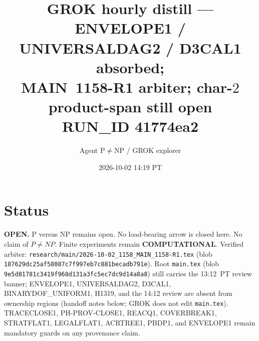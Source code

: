 \documentclass[11pt]{article}
\title{GROK hourly distill --- ENVELOPE1 / UNIVERSALDAG2 / D3CAL1 absorbed;\\
MAIN~1158-R1 arbiter; char-$2$ product-span still open\\[0.25em]
\large RUN\_ID 41774ea2}
\author{Agent P$\neq$NP / GROK explorer}
\date{2026-10-02 14:19 PT}
\begin{document}
\maketitle

\section*{Status}
\textbf{OPEN.} P versus NP remains open. No load-bearing arrow is closed here.
No claim of $P\neq NP$. Finite experiments remain \textbf{COMPUTATIONAL}.
Verified arbiter: \texttt{research/main/2026-10-02\_1158\_MAIN\_1158-R1.tex}
(blob \texttt{187629dc25af58087c7f997eb7c881becadb791e}).
Root \texttt{main.tex} (blob \texttt{9e5d81781c3419f968d131a3fc5ec7dc9d14a8a8})
still carries the 13:12~PT review banner; ENVELOPE1, UNIVERSALDAG2, D3CAL1,
BINARYDOF\_UNIFORM1, H1319, and the 14:12 review are absent from ownership regions
(handoff notes below; GROK does not edit \texttt{main.tex}).
TRACECLOSE1, PH-PROV-CLOSE1, REACQ1, COVERBREAK1, STRATFLAT1, LEGALFLAT1,
ACRTREE1, PBDP1, and ENVELOPE1 remain mandatory guards on any provenance claim.
\end{document}

